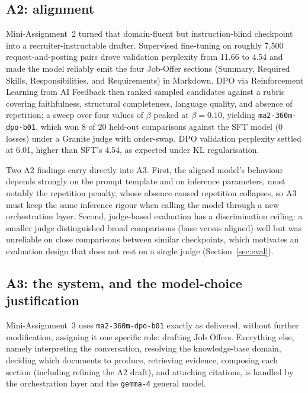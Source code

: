 \subsection{A2: alignment}

Mini-Assignment~2 turned that domain-fluent but instruction-blind checkpoint into a
recruiter-instructable drafter. Supervised fine-tuning on roughly 7,500
request-and-posting pairs drove validation perplexity from 11.66 to 4.54 and made the
model reliably emit the four Job-Offer sections (Summary, Required Skills,
Responsibilities, and Requirements) in Markdown. DPO via Reinforcement Learning from AI
Feedback then ranked sampled candidates against a rubric covering faithfulness, structural
completeness, language quality, and absence of repetition; a sweep over four values of
$\beta$ peaked at $\beta = 0.10$, yielding \verb|ma2-360m-dpo-b01|, which won 8 of 20
held-out comparisons against the SFT model (0 losses) under a Granite judge with
order-swap. DPO validation perplexity settled at 6.01, higher than SFT's 4.54, as
expected under KL regularisation.

Two A2 findings carry directly into A3. First, the aligned model's behaviour depends
strongly on the prompt template and on inference parameters, most notably the repetition
penalty, whose absence caused repetition collapses, so A3 must keep the same inference
rigour when calling the model through a new orchestration layer. Second, judge-based
evaluation has a discrimination ceiling: a smaller judge distinguished broad comparisons
(base versus aligned) well but was unreliable on close comparisons between similar
checkpoints, which motivates an evaluation design that does not rest on a single judge
(Section~\ref{sec:eval}).

\subsection{A3: the system, and the model-choice justification}

Mini-Assignment~3 uses \verb|ma2-360m-dpo-b01| exactly as delivered, without further
modification, assigning it one specific role: drafting Job Offers. Everything else, namely
interpreting the conversation, resolving the knowledge-base domain, deciding which
documents to produce, retrieving evidence, composing each section (including refining the
A2 draft), and attaching citations, is handled by the orchestration layer and the
\verb|gemma-4| general model.


